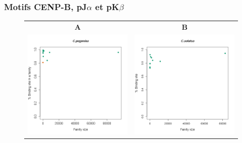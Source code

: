 \documentclass[12pt,a4paper]{article}
\begin{document}
			\subsubsection{Motifs CENP-B, pJ$\alpha$ et pK$\beta$}
\begin{figure}	
	\begin{tabular}{cc} 
		\textbf{A} & \textbf{B} \\
		\includegraphics[scale=0.5]{img/Cp_motifs.png} & \includegraphics[scale=0.5]{img/Cso_motifs.png} \\

\end{tabular}
\end{figure}
\end{document}
